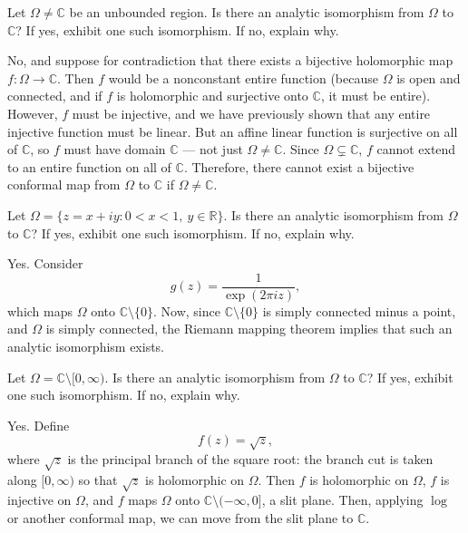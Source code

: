 \documentclass[12pt]{article}
\begin{document}
\begin{statement}[4]
    Let $\Omega \neq \mathbb{C}$ be an unbounded region. Is there an analytic isomorphism from $\Omega$ to $\mathbb{C}$? If yes, exhibit one such isomorphism. If no, explain why.
\end{statement}
\begin{newproof}
    No, and suppose for contradiction that there exists a bijective holomorphic map $ f : \Omega \longrightarrow \mathbb{C}. $ Then $f$ would be a nonconstant entire function (because $\Omega$ is open and connected, and if $f$ is holomorphic and surjective onto $\mathbb{C}$, it must be entire). However, $f$ must be injective, and we have previously shown that any entire injective function must be linear. But an affine linear function is surjective on all of $\mathbb{C}$, so $f$ must have domain $\mathbb{C}$ — not just $\Omega \neq \mathbb{C}$. Since $\Omega \subsetneq \mathbb{C}$, $f$ cannot extend to an entire function on all of $\mathbb{C}$. Therefore, there cannot exist a bijective conformal map from $\Omega$ to $\mathbb{C}$ if $\Omega \neq \mathbb{C}$.
\end{newproof}

\begin{statement}[5]
    Let $\Omega = \{ z = x + iy : 0 < x < 1,\ y \in \mathbb{R} \}$. Is there an analytic isomorphism from $\Omega$ to $\mathbb{C}$? If yes, exhibit one such isomorphism. If no, explain why.
\end{statement}
\begin{newproof}
    Yes. Consider
    $$ g(z) = \frac{1}{\exp(2\pi i z)}, $$
    which maps $\Omega$ onto $\mathbb{C} \setminus \{0\}$. Now, since $\mathbb{C} \setminus \{0\}$ is simply connected minus a point, and $\Omega$ is simply connected, the Riemann mapping theorem implies that such an analytic isomorphism exists.
\end{newproof}

\begin{statement}[6]
    Let $\Omega = \mathbb{C} \setminus [0, \infty)$. Is there an analytic isomorphism from $\Omega$ to $\mathbb{C}$? If yes, exhibit one such isomorphism. If no, explain why.
\end{statement}
\begin{newproof}
    Yes. Define
    $$ f(z) = \sqrt{z}, $$
    where $\sqrt{z}$ is the principal branch of the square root: the branch cut is taken along $[0,\infty)$ so that $\sqrt{z}$ is holomorphic on $\Omega$. Then $f$ is holomorphic on $\Omega$, $f$ is injective on $\Omega$, and $f$ maps $\Omega$ onto $\mathbb{C} \setminus (-\infty, 0]$, a slit plane. Then, applying $\log$ or another conformal map, we can move from the slit plane to $\mathbb{C}$.
\end{newproof}
\end{document}
